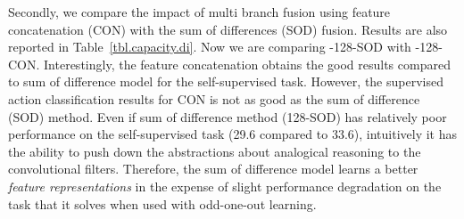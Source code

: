 Secondly, we compare the impact of multi branch fusion using feature concatenation (CON) with the sum of differences (SOD) fusion. 
Results are also reported in Table~\ref{tbl.capacity.di}. 
Now we are comparing -128-SOD with -128-CON.
Interestingly, the feature concatenation obtains the good results compared to sum of difference model for the self-supervised task.
However, the supervised action classification results for CON is not as good as the sum of difference (SOD) method. 
Even if sum of difference method (128-SOD) has relatively poor performance on the self-supervised task (29.6 compared to 33.6), intuitively it has the ability to push down the abstractions about analogical reasoning to the convolutional filters.
Therefore, the sum of difference model learns a better \emph{feature representations} in the expense of slight performance degradation on the task that it solves when used with odd-one-out learning.
